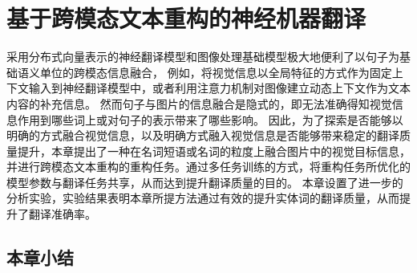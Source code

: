 \chapter{基于跨模态文本重构的神经机器翻译}

% 


采用分布式向量表示的神经翻译模型和图像处理基础模型极大地便利了以句子为基础语义单位的跨模态信息融合，
例如，将视觉信息以全局特征的方式作为固定上下文输入到神经翻译模型中，或者利用注意力机制对图像建立动态上下文作为文本内容的补充信息。
然而句子与图片的信息融合是隐式的，即无法准确得知视觉信息作用到哪些词上或对句子的表示带来了哪些影响。
因此，为了探索是否能够以明确的方式融合视觉信息，以及明确方式融入视觉信息是否能够带来稳定的翻译质量提升，本章提出了一种在名词短语或名词的粒度上融合图片中的视觉目标信息，并进行跨模态文本重构的重构任务。通过多任务训练的方式，将重构任务所优化的模型参数与翻译任务共享，从而达到提升翻译质量的目的。
本章设置了进一步的分析实验，实验结果表明本章所提方法通过有效的提升实体词的翻译质量，从而提升了翻译准确率。








\section{本章小结}
